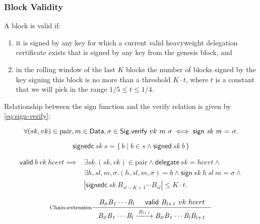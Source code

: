 \documentclass[11pt,a4paper]{article}
\newcommand\Set[2]{\{\,#1\mid#2\,\}}
\newcommand{\var}[1]{\mathit{#1}}
\newcommand{\fun}[1]{\mathsf{#1}}
\newcommand{\type}[1]{\mathsf{#1}}
\newcommand{\trans}[2]{\xlongrightarrow[\textsc{#1}]{#2}}
\newcommand{\nextdef}{\\[1em]}
\newcommand{\Sig}{\type{Sig}}
\newcommand{\Data}{\type{Data}}
\newcommand{\signname}{sign}
\newcommand{\signedname}{signed}
\newcommand{\signedseq}{signedc}
\newcommand{\verifyname}{verify}
\newcommand{\delegatename}{delegate}
\newcommand{\validname}{valid}
\newcommand{\keypairname}{pair}
\newcommand{\sign}[4]{\fun{\signname}\ \var{#1} ~ \var{#2} ~ \var{#3} ~ \var{#4}}
\newcommand{\signed}[2]{\fun{\signedname}\ \var{#1} ~ \var{#2}}
\newcommand{\signedwindow}[2]{\fun{\signedseq}\ \var{#1} ~ \var{#2}}
\newcommand{\verify}[3]{\fun{\verifyname} ~ #1 ~ #2 ~ #3}
\newcommand{\delegate}[1]{\fun{\delegatename}\ \var{#1}}
\newcommand{\valid}[3]{\fun{\validname} ~ #1 ~ #2 ~ #3}
\begin{document}
\subsubsection{Block Validity}
\label{sec:block-valid}
A block is valid if:
\begin{enumerate}
\item it is signed by any key for which a current valid heavyweight delegation
  certificate exists that is signed by any key from the genesis block, and
\item in the rolling window of the last $K$ blocks the number of blocks signed
  by the key signing this block is no more than a threshold $K \cdot t$, where
  $t$ is a constant that we will pick in the range $1/5 \leq t \leq 1/4$.
\end{enumerate}


Relationship between the $\text{\signname}$ function and the
$\text{\verifyname}$ relation is given by \ref{eq:sign-verify}:

\begin{equation}
  \label{eq:sign-verify}
  \forall (sk, vk) \in \text{\keypairname}, m \in \Data, \sigma \in \Sig.\\
  \nextdef
  \verify{vk}{m}{\sigma} \iff \sign{sk}{m} = \sigma.
\end{equation}

\begin{equation}
  \label{eq:signed-window}
  \signedwindow{sk}{s} = \Set{b}{b \in s \wedge \signed{sk}{b}}
\end{equation}

\begin{align}
  \label{eq:valid-block}
    \valid{b}{vk}{hcert} \implies &
      \exists sk. (sk, vk) \in \text{\keypairname} \wedge
      \delegate{sk} = hcert \wedge \\
      & \exists h, sl, m, \sigma. (h, sl, m, \sigma) = b \wedge
        \sign{sk}{h}{sl}{m} = \sigma \wedge \\
      & | \signedwindow{sk}{\var{B_{sl-K+1}} \cdots \var{B_{sl}}} | \leq K \cdot t.
\end{align}

\begin{equation}
  \label{eq:chain-extension}
  \inference[Chain-extension]
  {\var{B_0}\var{B_1}\cdots\var{B_l} & \valid{\var{B_{l+1}}}{vk}{hcert}
  }
  {{\var{B_0}\var{B_1}\cdots\var{B_l}} \trans{}{\var{B_{l+1}}} {\var{B_0}\var{B_1}\cdots\var{B_l}\var{B_{l+1}}}}
\end{equation}
\end{document}
